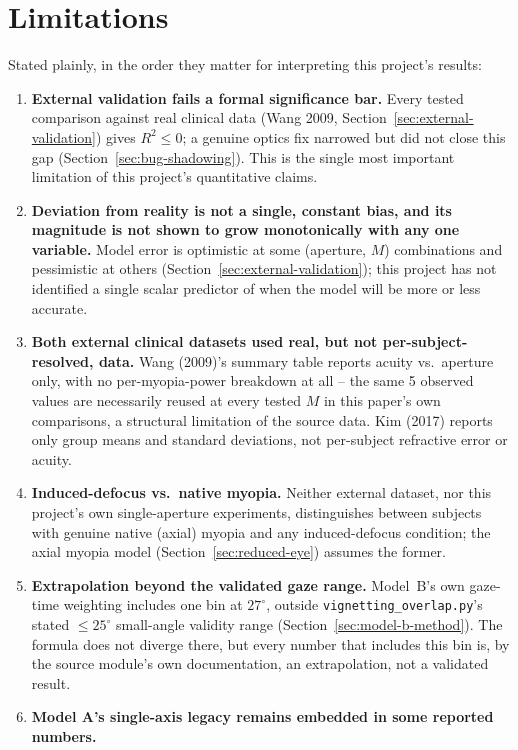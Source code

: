 \chapter{Limitations}
\label{ch:limitations}

Stated plainly, in the order they matter for interpreting this project's results:

\begin{enumerate}
\item \textbf{External validation fails a formal significance bar.} Every tested
comparison against real clinical data (Wang 2009, Section~\ref{sec:external-validation})
gives $R^2\le0$; a genuine optics fix narrowed but did not close this gap
(Section~\ref{sec:bug-shadowing}). This is the single most important limitation of this
project's quantitative claims.
\item \textbf{Deviation from reality is not a single, constant bias, and its magnitude
is not shown to grow monotonically with any one variable.} Model error is optimistic at
some (aperture, $M$) combinations and pessimistic at others
(Section~\ref{sec:external-validation}); this project has not identified a single
scalar predictor of when the model will be more or less accurate.
\item \textbf{Both external clinical datasets used real, but not per-subject-resolved,
data.} Wang (2009)'s summary table reports acuity vs.\ aperture only, with no
per-myopia-power breakdown at all -- the same 5 observed values are necessarily reused
at every tested $M$ in this paper's own comparisons, a structural limitation of the
source data. Kim (2017) reports only group means and standard deviations, not
per-subject refractive error or acuity.
\item \textbf{Induced-defocus vs.\ native myopia.} Neither external dataset, nor this
project's own single-aperture experiments, distinguishes between subjects with genuine
native (axial) myopia and any induced-defocus condition; the axial myopia model
(Section~\ref{sec:reduced-eye}) assumes the former.
\item \textbf{Extrapolation beyond the validated gaze range.} Model~B's own gaze-time
weighting includes one bin at $27^\circ$, outside \texttt{vignetting\_overlap.py}'s
stated $\le25^\circ$ small-angle validity range (Section~\ref{sec:model-b-method}). The
formula does not diverge there, but every number that includes this bin is, by the
source module's own documentation, an extrapolation, not a validated result.
\item \textbf{Model A's single-axis legacy remains embedded in some reported numbers.}

\end{enumerate}

